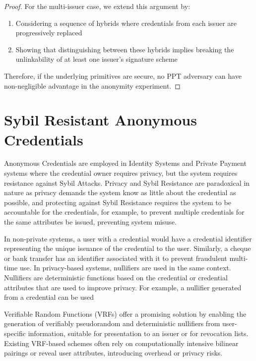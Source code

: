 \begin{proof}
\noindent For the multi-issuer case, we extend this argument by:
\begin{enumerate}
    \item Considering a sequence of hybrids where credentials from each issuer are progressively replaced
    
    \item Showing that distinguishing between these hybrids implies breaking the unlinkability of at least one issuer's signature scheme
\end{enumerate}

\noindent Therefore, if the underlying primitives are secure, no PPT adversary can have non-negligible advantage in the anonymity experiment.
\end{proof}
















\newpage
\section{Sybil Resistant Anonymous Credentials}
Anonymous Credentials are employed in Identity Systems and Private Payment systems where the credential owner requires privacy, but the system requires resistance against Sybil Attacks. Privacy and Sybil Resistance are paradoxical in nature as privacy demands the system know as little about the credential as possible, and protecting against Sybil Resistance requires the system to be accountable for the credentials, for example, to prevent multiple credentials for the same attributes be issued, preventing system misuse. 

In non-private systems, a user with a credential would have a credential identifier representing the unique issuance of the credential to the user. Similarly, a cheque or bank transfer has an identifier associated with it to prevent fraudulent multi-time use. In privacy-based systems, nullifiers are used in the same context. Nullifiers are deterministic functions based on the credential or credential attributes that are used to improve privacy. For example, a nullifier generated from a credential can be used 

 Verifiable Random Functions (VRFs) offer a promising solution by enabling the generation of verifiably pseudorandom and deterministic nullifiers from user-specific information, suitable for presentation to an issuer or for revocation lists. Existing VRF-based schemes often rely on computationally intensive bilinear pairings or reveal user attributes, introducing overhead or privacy risks.


